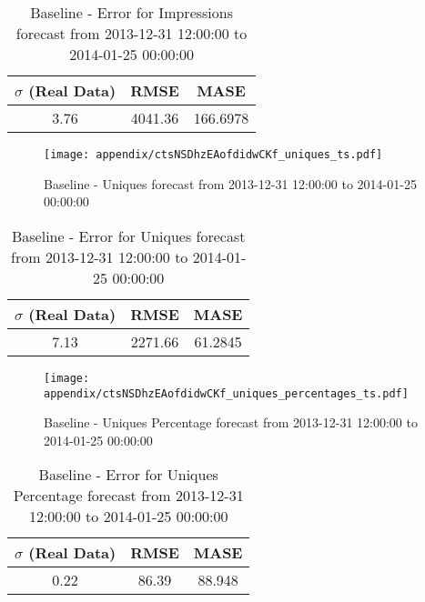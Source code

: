 \begin{table}[H]
\centering
\footnotesize
\begin{tabular}{ccc}
$\sigma$ (Real Data) & RMSE & MASE   \\ \hline
3.76 & 4041.36 & 166.6978 \\
\end{tabular}

\vspace{0.5cm}

\caption[]{
Baseline - Error for Impressions forecast from 2013-12-31 12:00:00 to 2014-01-25 00:00:00}
\end{table}

\begin{figure}[H] \begin{center} \leavevmode
\texttt{[image: appendix/ctsNSDhzEAofdidwCKf\_uniques\_ts.pdf]} \caption[]{
Baseline - Uniques forecast from 2013-12-31 12:00:00 to 2014-01-25 00:00:00} \label{fig:appendix/ctsNSDhzEAofdidwCKf_uniques_ts.pdf} \end{center}
\end{figure}

\begin{table}[H]
\centering
\footnotesize
\begin{tabular}{ccc}
$\sigma$ (Real Data) & RMSE & MASE   \\ \hline
7.13 & 2271.66 & 61.2845 \\
\end{tabular}

\vspace{0.5cm}

\caption[]{
Baseline - Error for Uniques forecast from 2013-12-31 12:00:00 to 2014-01-25 00:00:00}
\end{table}

\begin{figure}[H] \begin{center} \leavevmode
\texttt{[image: appendix/ctsNSDhzEAofdidwCKf\_uniques\_percentages\_ts.pdf]} \caption[]{
Baseline - Uniques Percentage forecast from 2013-12-31 12:00:00 to 2014-01-25 00:00:00} \label{fig:appendix/ctsNSDhzEAofdidwCKf_uniques_percentages_ts.pdf} \end{center}
\end{figure}

\begin{table}[H]
\centering
\footnotesize
\begin{tabular}{ccc}
$\sigma$ (Real Data) & RMSE & MASE   \\ \hline
0.22 & 86.39 & 88.948 \\
\end{tabular}

\vspace{0.5cm}

\caption[]{
Baseline - Error for Uniques Percentage forecast from 2013-12-31 12:00:00 to 2014-01-25 00:00:00}
\end{table}

